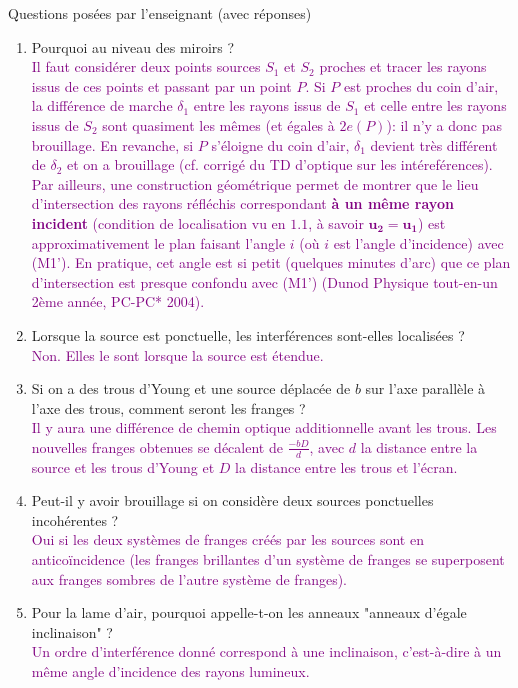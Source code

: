 \begin{reportBlock}{Questions posées par l’enseignant (avec réponses)}
\begin{enumerate}
     \item Pourquoi au niveau des miroirs ? \\
       \textcolor{purple}{Il faut considérer deux points sources $S_1$ et $S_2$ proches et tracer les rayons issus de ces points et passant par un point $P$. Si $P$ est proches du coin d'air, la différence de marche $\delta_1$ entre les rayons issus de $S_1$ et celle entre les rayons issus de $S_2$ sont quasiment les mêmes (et égales à $2e(P)$): il n'y a donc pas brouillage. En revanche, si $P$ s'éloigne du coin d'air, $\delta_1$ devient très différent de $\delta_2$ et on a brouillage (cf. corrigé du TD d'optique sur les intéreférences). \\
       Par ailleurs, une construction géométrique permet de montrer que le lieu d'intersection des rayons réfléchis correspondant \textbf{à un même rayon incident} (condition de localisation vu en $1.1$, à savoir $\mathbf{u_2} = \mathbf{u_1}$) est approximativement le plan faisant l'angle $i$ (où $i$ est l'angle d'incidence) avec (M1'). En pratique, cet angle est si petit (quelques minutes d'arc) que ce plan d'intersection est presque confondu avec (M1') (Dunod Physique tout-en-un 2ème année, PC-PC* 2004).}
    
    \item Lorsque la source est ponctuelle, les interférences sont-elles localisées ? \\
       \textcolor{purple}{Non. Elles le sont lorsque la source est étendue.}
       
    \item Si on a des trous d'Young et une source déplacée de $b$ sur l'axe parallèle à l'axe des trous, comment seront les franges ? \\
       \textcolor{purple}{Il y aura une différence de chemin optique additionnelle avant les trous. Les nouvelles franges obtenues se décalent de $\frac{-bD}{d}$, avec $d$ la distance entre la source et les trous d'Young et $D$ la distance entre les trous et l'écran.}
    
    \item Peut-il y avoir brouillage si on considère deux sources ponctuelles incohérentes ?\\
    \textcolor{purple}{Oui si les deux systèmes de franges créés par les sources sont en anticoïncidence (les franges brillantes d'un système de franges se superposent aux franges sombres de l'autre système de franges).}
       
    \item Pour la lame d'air, pourquoi appelle-t-on les anneaux "anneaux d'égale inclinaison" ? \\
       \textcolor{purple}{Un ordre d'interférence donné correspond à une inclinaison, c'est-à-dire à un même angle d'incidence des rayons lumineux.}
       

\end{enumerate}
\end{reportBlock}
